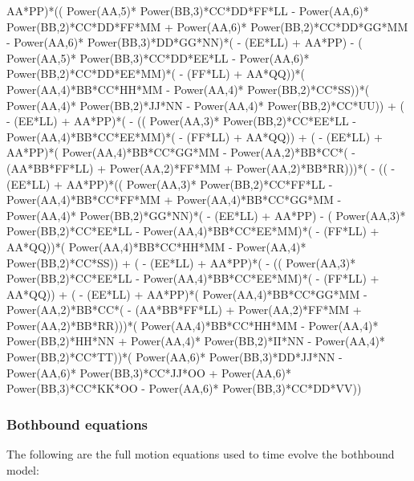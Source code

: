 \documentclass[10pt]{article} %
\begin{document}
AA*PP)*(( Power(AA,5)* Power(BB,3)*CC*DD*FF*LL -  Power(AA,6)* Power(BB,2)*CC*DD*FF*MM +  Power(AA,6)* Power(BB,2)*CC*DD*GG*MM -  Power(AA,6)* Power(BB,3)*DD*GG*NN)*( - (EE*LL) + AA*PP) - ( Power(AA,5)* Power(BB,3)*CC*DD*EE*LL -  Power(AA,6)* Power(BB,2)*CC*DD*EE*MM)*( - (FF*LL) + AA*QQ))*( Power(AA,4)*BB*CC*HH*MM -  Power(AA,4)* Power(BB,2)*CC*SS))*( Power(AA,4)* Power(BB,2)*JJ*NN -  Power(AA,4)* Power(BB,2)*CC*UU)) + ( - (EE*LL) + AA*PP)*( - (( Power(AA,3)* Power(BB,2)*CC*EE*LL -  Power(AA,4)*BB*CC*EE*MM)*( - (FF*LL) + AA*QQ)) + ( - (EE*LL) + AA*PP)*( Power(AA,4)*BB*CC*GG*MM -  Power(AA,2)*BB*CC*( - (AA*BB*FF*LL) +  Power(AA,2)*FF*MM +  Power(AA,2)*BB*RR)))*( - (( - (EE*LL) + AA*PP)*(( Power(AA,3)* Power(BB,2)*CC*FF*LL -  Power(AA,4)*BB*CC*FF*MM +  Power(AA,4)*BB*CC*GG*MM -  Power(AA,4)* Power(BB,2)*GG*NN)*( - (EE*LL) + AA*PP) - ( Power(AA,3)* Power(BB,2)*CC*EE*LL -  Power(AA,4)*BB*CC*EE*MM)*( - (FF*LL) + AA*QQ))*( Power(AA,4)*BB*CC*HH*MM -  Power(AA,4)* Power(BB,2)*CC*SS)) + ( - (EE*LL) + AA*PP)*( - (( Power(AA,3)* Power(BB,2)*CC*EE*LL -  Power(AA,4)*BB*CC*EE*MM)*( - (FF*LL) + AA*QQ)) + ( - (EE*LL) + AA*PP)*( Power(AA,4)*BB*CC*GG*MM -  Power(AA,2)*BB*CC*( - (AA*BB*FF*LL) +  Power(AA,2)*FF*MM +  Power(AA,2)*BB*RR)))*( Power(AA,4)*BB*CC*HH*MM -  Power(AA,4)* Power(BB,2)*HH*NN +  Power(AA,4)* Power(BB,2)*II*NN -  Power(AA,4)* Power(BB,2)*CC*TT))*( Power(AA,6)* Power(BB,3)*DD*JJ*NN -  Power(AA,6)* Power(BB,3)*CC*JJ*OO +  Power(AA,6)* Power(BB,3)*CC*KK*OO -  Power(AA,6)* Power(BB,3)*CC*DD*VV))

\subsubsection{Bothbound equations}
\label{sec:bb-motion-equations}
The following are the full motion equations used to time evolve the bothbound model:
\end{document}
